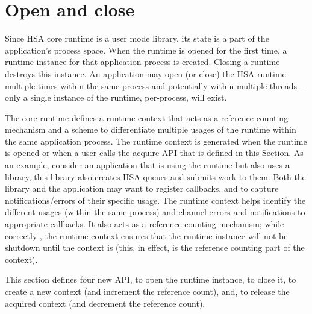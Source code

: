 \DIFdelbegin %
\DIFdelend \DIFaddbegin \begin{DIFnomarkup}
\hypertarget{init}{}\section{Open and close
}\label{init}
\end{DIFnomarkup}
\DIFaddend 

Since HSA core runtime is a user mode library, its state is a part
of the application's process space. When the runtime is opened for
the first time, a runtime instance for that application process is
created. Closing a runtime destroys this instance. An application
may open (or close) the HSA runtime multiple times within the same
process and potentially within multiple threads -- only a
single instance of the runtime, per-process, will exist.

The core runtime defines a runtime context that acts as a reference
counting mechanism and a scheme to differentiate multiple usages of
the runtime within the same application process. The runtime context
is generated when the runtime is opened or when a
user calls the acquire API that is defined in this Section. As an
example, consider an application that is using the runtime but also
uses a library, this library also creates HSA queues and submits
work to them. Both the library and the application may want to register
callbacks, and to capture notifications/errors of their specific
usage. The runtime context helps identify the different usages (within
the same process) and channel errors and notifications to
appropriate callbacks. It also acts as a reference counting
mechanism; while correctly , the runtime context
ensures that the runtime instance will not be shutdown until the
context is  (this, in effect, is the reference
counting part of the context).

This section defines four new API,  to open the
runtime instance,  to close it,
 to create a new context (and increment
the reference count), and,  to release
the acquired context (and decrement the reference count).


